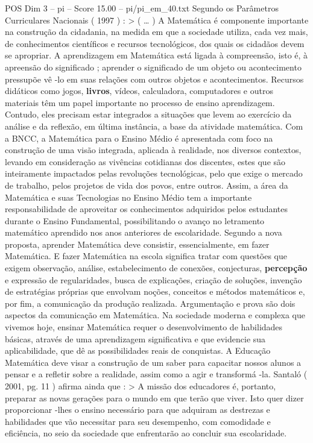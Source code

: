 \begin{textsample}{POS Dim 3 – pi – Score 15.00 – pi/pi\_em\_40.txt}
Segundo os Parâmetros Curriculares Nacionais ( 1997 ) : > ( … ) A Matemática é componente importante na construção da cidadania, na medida em que a sociedade utiliza, cada vez mais, de conhecimentos científicos e recursos tecnológicos, dos quais os cidadãos devem se apropriar.
A aprendizagem em Matemática está ligada à compreensão, isto é, à apreensão do significado ; aprender o significado de um objeto ou acontecimento pressupõe vê -lo em suas relações com outros objetos e acontecimentos.
Recursos didáticos como jogos, \textbf{livros}, vídeos, calculadora, computadores e outros materiais têm um papel importante no processo de ensino aprendizagem.
Contudo, eles precisam estar integrados a situações que levem ao exercício da análise e da reflexão, em última instância, a base da atividade matemática.
Com a BNCC, a Matemática para o Ensino Médio é apresentada com foco na construção de uma visão integrada, aplicada à realidade, nos diversos contextos, levando em consideração as vivências cotidianas dos discentes, estes que são inteiramente impactados pelas revoluções tecnológicas, pelo que exige o mercado de trabalho, pelos projetos de vida dos povos, entre outros.
Assim, a área da Matemática e suas Tecnologias no Ensino Médio tem a importante responsabilidade de aproveitar os conhecimentos adquiridos pelos estudantes durante o Ensino Fundamental, possibilitando o avanço no letramento matemático aprendido nos anos anteriores de escolaridade.
Segundo a nova proposta, aprender Matemática deve consistir, essencialmente, em fazer Matemática.
E fazer Matemática na escola significa tratar com questões que exigem observação, análise, estabelecimento de conexões, conjecturas, \textbf{percepção} e expressão de regularidades, busca de explicações, criação de soluções, invenção de estratégias próprias que envolvam noções, conceitos e métodos matemáticos e, por fim, a comunicação da produção realizada.
Argumentação e prova são dois aspectos da comunicação em Matemática.
Na sociedade moderna e complexa que vivemos hoje, ensinar Matemática requer o desenvolvimento de habilidades básicas, através de uma aprendizagem significativa e que evidencie sua aplicabilidade, que dê as possibilidades reais de conquistas.
A Educação Matemática deve visar a construção de um saber para capacitar nossos alunos a pensar e a refletir sobre a realidade, assim como a agir e transformá -la.
Santaló ( 2001, pg. 11 ) afirma ainda que : > A missão dos educadores é, portanto, preparar as novas gerações para o mundo em que terão que viver.
Isto quer dizer proporcionar -lhes o ensino necessário para que adquiram as destrezas e habilidades que vão necessitar para seu desempenho, com comodidade e eficiência, no seio da sociedade que enfrentarão ao concluir sua escolaridade.

\end{textsample}
